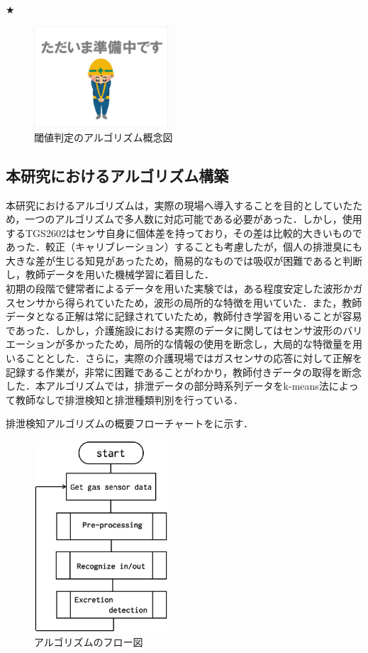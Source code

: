 ★
\begin{figure}[htbp]
   \centering
   \includegraphics[width=5cm]{./fig/temp.eps}
   \caption{閾値判定のアルゴリズム概念図}
   \label{mic17a}
\end{figure}

\subsection{本研究におけるアルゴリズム構築}\label{chap:3.3.2}
本研究におけるアルゴリズムは，実際の現場へ導入することを目的としていたため，一つのアルゴリズムで多人数に対応可能である必要があった．しかし，使用するTGS2602はセンサ自身に個体差を持っており，その差は比較的大きいものであった．較正（キャリブレーション）することも考慮したが，個人の排泄臭にも大きな差が生じる知見があったため，簡易的なものでは吸収が困難であると判断し，教師データを用いた機械学習に着目した．\\
初期の段階で健常者によるデータを用いた実験では，ある程度安定した波形かガスセンサから得られていたため，波形の局所的な特徴を用いていた．また，教師データとなる正解は常に記録されていたため，教師付き学習を用いることが容易であった．しかし，介護施設における実際のデータに関してはセンサ波形のバリエーションが多かったため，局所的な情報の使用を断念し，大局的な特徴量を用いることとした．さらに，実際の介護現場ではガスセンサの応答に対して正解を記録する作業が，非常に困難であることがわかり，教師付きデータの取得を断念した．本アルゴリズムでは，排泄データの部分時系列データをk-means法によって教師なしで排泄検知と排泄種類判別を行っている．

排泄検知アルゴリズムの概要フローチャートをに示す．
\begin{figure}[t]
\centering
\includegraphics[width=5cm]{./fig/algoflow.eps}
\caption{アルゴリズムのフロー図}
\label{algo_flow}
\end{figure}

